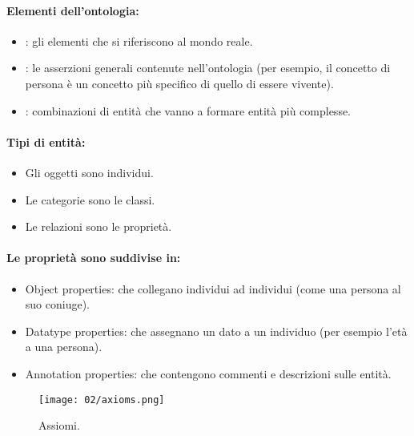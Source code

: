 \paragraph{Elementi dell'ontologia:}

\begin{itemize}
  \item {}: gli elementi che si riferiscono al mondo reale. 
  \item {}: le asserzioni generali contenute nell’ontologia
(per esempio, il concetto di persona è un concetto più
specifico di quello di essere vivente). 
\item {}: combinazioni di entità che vanno a
formare entità più complesse.
\end{itemize}

\paragraph{Tipi di entità:}

\begin{itemize}
  \item Gli oggetti sono individui. 
  \item Le categorie sono le classi. 
  \item Le relazioni sono le proprietà.
\end{itemize}

\paragraph{Le proprietà sono suddivise in:}

\begin{itemize}
  \item Object properties: che collegano individui ad individui (come una
persona al suo coniuge).
\item Datatype properties: che assegnano un dato a un individuo (per
esempio l’età a una persona). 
\item Annotation properties: che contengono commenti e descrizioni sulle
entità.
\end{itemize}


\begin{figure}[h]
    \centering
    \texttt{[image: 02/axioms.png]}
    \caption{Assiomi.}
\end{figure}


